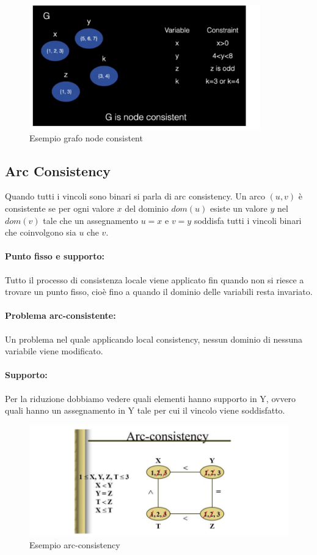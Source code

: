 \begin{figure}[H]
    \centering
    \includegraphics[width=10cm, keepaspectratio]{img/Cap3/node1.png}
    \caption{Esempio grafo node consistent}
\end{figure}

\subsection{Arc Consistency}
Quando tutti i vincoli sono binari si parla di arc consistency. Un arco $(u,v)$ è
consistente se per ogni valore $x$ del dominio $dom(u)$ esiste un valore $y$ nel
$dom(v)$ tale che un assegnamento $u=x$ e $v=y$ soddisfa tutti i vincoli binari
che coinvolgono sia $u$ che $v$.

\paragraph{Punto fisso e supporto:}
Tutto il processo di consistenza locale viene applicato fin quando non si riesce
a trovare un punto fisso, cioè fino a quando il dominio delle variabili resta
invariato.

\paragraph{Problema arc-consistente:} Un problema nel quale applicando local
consistency, nessun dominio di nessuna variabile viene modificato.

\paragraph{Supporto:} Per la riduzione dobbiamo vedere quali elementi
hanno supporto in Y, ovvero quali hanno un assegnamento in Y tale per cui il
vincolo viene soddisfatto.

\begin{figure}[H]
    \centering
    \includegraphics[width=13cm, keepaspectratio]{img/Cap3/esempio-arc.png}
    \caption{Esempio arc-consistency}
\end{figure}


